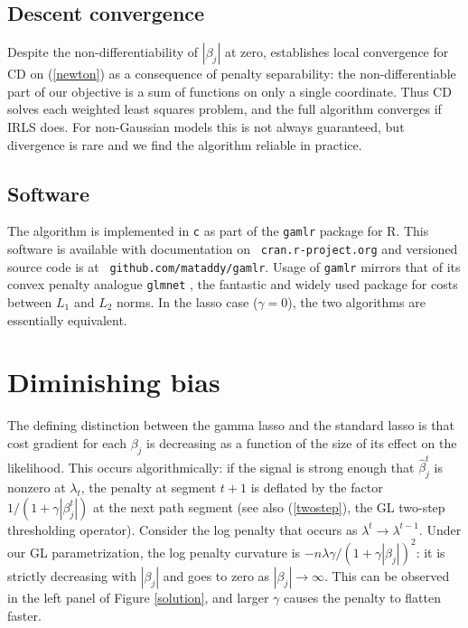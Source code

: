 \documentclass[12pt]{article}
\begin{document}
\subsection{Descent convergence}

 Despite the non-differentiability of $|\beta_j|$ at zero,
\citet{tseng_convergence_2001} establishes local convergence for CD on
(\ref{newton}) as a consequence of penalty separability: the 
non-differentiable part of our objective is a sum of functions on only a single
coordinate.  Thus CD solves each weighted least squares problem, and  the full
algorithm converges if IRLS does.  For non-Gaussian models this is not always
guaranteed, but divergence is rare and we find the algorithm reliable in
practice.


\subsection{Software}

The algorithm is implemented in {\tt c} as part of the {\tt gamlr} package for
{\sf R}. This software is available with documentation on {\tt
cran.r-project.org} and versioned source code is at {\tt
github.com/mataddy/gamlr}.  Usage of {\tt gamlr} mirrors that of its convex
penalty analogue {\tt glmnet} \citep{friedman_regularization_2010}, the
fantastic and widely used package for costs between $L_1$ and $L_2$
norms. In the lasso case ($\gamma=0$), the two algorithms are essentially
equivalent.



\section{Diminishing bias}
\label{concave}

The defining distinction between the gamma lasso and the standard lasso is
that cost gradient for each $\beta_j$ is decreasing as a function of the size
of its effect  on the likelihood. This occurs algorithmically: if the signal
is strong enough that $\hat \beta^t_j$ is nonzero at $\lambda_t$,  the penalty
at segment $t+1$ is deflated by the factor $1/(1+ \gamma|\beta^t_j|)$ at the
next path segment (see also (\ref{twostep}), the GL two-step thresholding
operator). Consider the log penalty that occurs as $\lambda^t \rightarrow
\lambda^{t-1}$. Under our GL parametrization, the log penalty curvature is
$-n\lambda\gamma/(1+\gamma|\beta_j|)^2$: it is strictly decreasing with
$|\beta_j|$ and goes to zero as $|\beta_j| \rightarrow \infty$. This can be
observed in the left panel of Figure \ref{solution}, and larger $\gamma$
causes the penalty to flatten faster.
\end{document}
